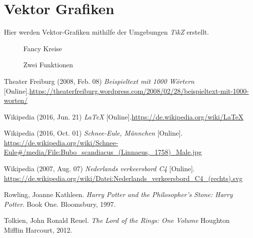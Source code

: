 \documentclass{scrreprt}
\begin{document}
\newpage

\chapter{Vektor Grafiken}
\label{cha:vektor}
Hier werden Vektor-Grafiken mithilfe der Umgebungen \textit{TikZ} erstellt.
\vspace{5pt} \\
\begin{figure}[h!]
\caption{Fancy Kreise}
\label{fig:fancykreise}
\end{figure}
\begin{figure}[h!]
	\centering
{}
\caption{Zwei Funktionen}
\label{fig:zweifunktionen}
\end{figure}





\newpage

\begin{thebibliography}{mmmmmmm}
\label{bib:thebib}
	 Theater Freiburg (2008, Feb. 08) \textit{Beispieltext mit 1000 Wörtern} [Online].\newline \url{https://theaterfreiburg.wordpress.com/2008/02/28/beispieltext-mit-1000-worten/} 
	
	 Wikipedia (2016, Jun. 21) \textit{LaTeX} [Online].\newline \url{https://de.wikipedia.org/wiki/LaTeX} 
	
	 Wikipedia (2016, Oct. 01) \textit{Schnee-Eule, Männchen} [Online]. \newline
	\url{https://de.wikipedia.org/wiki/Schnee-Eule#/media/File:Bubo_scandiacus_(Linnaeus,_1758)_Male.jpg}
	
	 Wikipedia (2007, Aug. 07) \textit{Nederlands verkeersbord C4} [Online]. \newline
	\url{https://de.wikipedia.org/wiki/Datei:Nederlands_verkeersbord_C4_(rechts).svg}
	
	 Rowling, Joanne Kathleen. \textit{Harry Potter and the Philosopher's Stone: Harry Potter}. Book One. Bloomsbury, 1997.
	
	 Tolkien, John Ronald Reuel. \textit{The Lord of the Rings: One Volume} Houghton Mifflin Harcourt, 2012.
	
	
	
	
\end{thebibliography}
\end{document}

